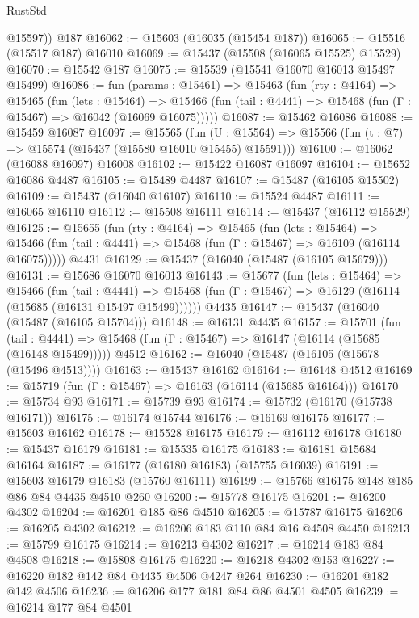 \begin{lexlean}{RustStd}
\begin{coremodule}
        @15597))
    @187
@16062 := @15603 (@16035 (@15454 @187))
@16065 := @15516 (@15517 @187) @16010
@16069 := @15437 (@15508 (@16065 @15525) @15529)
@16070 := @15542 @187
@16075 := @15539 (@15541 @16070 @16013 @15497 @15499)
@16086 := fun (params : @15461) =>
  @15463
    (fun (rty : @4164) =>
    @15465
      (fun (lets : @15464) =>
      @15466 (fun (tail : @4441) => @15468 (fun (Γ : @15467) => @16042 (@16069 @16075)))))
@16087 := @15462 @16086
@16088 := @15459 @16087
@16097 := @15565
    (fun (U : @15564) => @15566 (fun (t : @7) => @15574 (@15437 (@15580 @16010 @15455) @15591)))
@16100 := @16062 (@16088 @16097) @16008
@16102 := @15422 @16087 @16097
@16104 := @15652 @16086 @4487
@16105 := @15489 @4487
@16107 := @15487 (@16105 @15502)
@16109 := @15437 (@16040 @16107)
@16110 := @15524 @4487
@16111 := @16065 @16110
@16112 := @15508 @16111
@16114 := @15437 (@16112 @15529)
@16125 := @15655
    (fun (rty : @4164) =>
    @15465
      (fun (lets : @15464) =>
      @15466 (fun (tail : @4441) => @15468 (fun (Γ : @15467) => @16109 (@16114 @16075)))))
    @4431
@16129 := @15437 (@16040 (@15487 (@16105 @15679)))
@16131 := @15686 @16070 @16013
@16143 := @15677
    (fun (lets : @15464) =>
    @15466
      (fun (tail : @4441) =>
      @15468 (fun (Γ : @15467) => @16129 (@16114 (@15685 (@16131 @15497 @15499))))))
    @4435
@16147 := @15437 (@16040 (@15487 (@16105 @15704)))
@16148 := @16131 @4435
@16157 := @15701
    (fun (tail : @4441) => @15468 (fun (Γ : @15467) => @16147 (@16114 (@15685 (@16148 @15499)))))
    @4512
@16162 := @16040 (@15487 (@16105 (@15678 (@15496 @4513))))
@16163 := @15437 @16162
@16164 := @16148 @4512
@16169 := @15719 (fun (Γ : @15467) => @16163 (@16114 (@15685 @16164)))
@16170 := @15734 @93
@16171 := @15739 @93
@16174 := @15732 (@16170 (@15738 @16171))
@16175 := @16174 @15744
@16176 := @16169 @16175
@16177 := @15603 @16162
@16178 := @15528 @16175
@16179 := @16112 @16178
@16180 := @15437 @16179
@16181 := @15535 @16175
@16183 := @16181 @15684 @16164
@16187 := @16177 (@16180 @16183) (@15755 @16039)
@16191 := @15603 @16179 @16183 (@15760 @16111)
@16199 := @15766 @16175 @148 @185 @86 @84 @4435 @4510 @260
@16200 := @15778 @16175
@16201 := @16200 @4302
@16204 := @16201 @185 @86 @4510
@16205 := @15787 @16175
@16206 := @16205 @4302
@16212 := @16206 @183 @110 @84 @16 @4508 @4450
@16213 := @15799 @16175
@16214 := @16213 @4302
@16217 := @16214 @183 @84 @4508
@16218 := @15808 @16175
@16220 := @16218 @4302 @153
@16227 := @16220 @182 @142 @84 @4435 @4506 @4247 @264
@16230 := @16201 @182 @142 @4506
@16236 := @16206 @177 @181 @84 @86 @4501 @4505
@16239 := @16214 @177 @84 @4501

\end{coremodule}
\end{lexlean}
